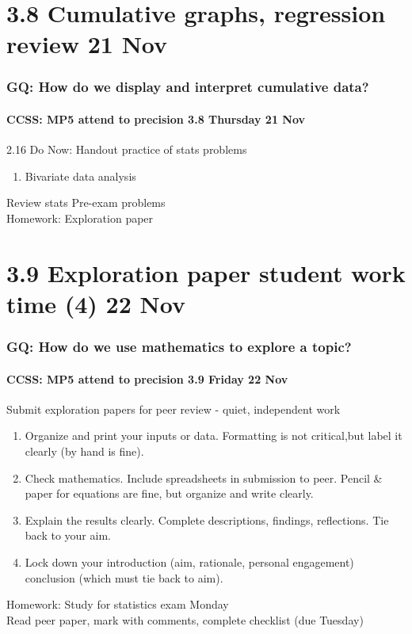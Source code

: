 \documentclass{beamer}
\begin{document}
\section{3.8 Cumulative graphs, regression review 21 Nov}
\frame
{
  \frametitle{GQ: How do we display and interpret cumulative data?}
  \framesubtitle{CCSS: MP5 attend to precision \hfill \alert{3.8 Thursday 21 Nov}}

  \begin{block}{2.16 Do Now: Handout practice of stats problems}
  \begin{enumerate}
      \item Bivariate data analysis
  \end{enumerate}
  \end{block}
  Review stats Pre-exam problems \\
  Homework: Exploration paper
}


\section{3.9 Exploration paper student work time (4) 22 Nov}
\frame
{
  \frametitle{GQ: How do we use mathematics to explore a topic?}
  \framesubtitle{CCSS: MP5 attend to precision \hfill \alert{3.9 Friday 22 Nov}}
  \begin{block}{Submit exploration papers for peer review - quiet, independent work}
  \begin{enumerate}
      \item Organize and print your inputs or data. Formatting is not critical,but label it clearly (by hand is fine). 
      \item Check mathematics. Include spreadsheets in submission to peer. Pencil \& paper for equations are fine, but organize and write clearly.
      \item Explain the results clearly. Complete descriptions, findings, reflections. Tie back to your aim.
      \item Lock down your introduction (aim, rationale, personal engagement)  conclusion (which must tie back to aim). 
  \end{enumerate}
  \end{block}
  Homework: Study for statistics \alert{exam Monday} \\
  Read peer paper, mark with comments, complete checklist (due Tuesday) 
}
\end{document}
